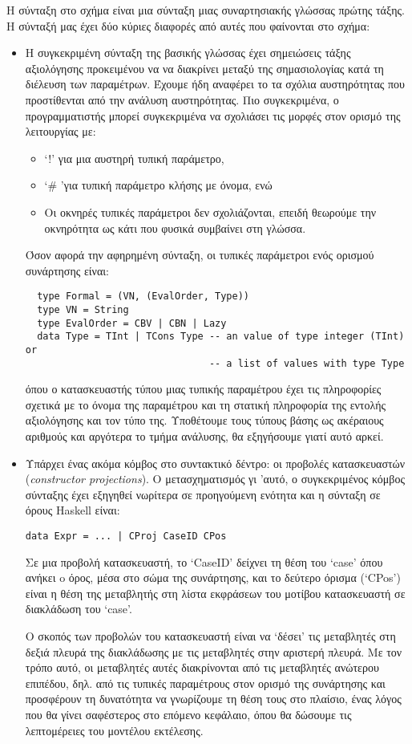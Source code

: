 \documentclass[diploma]{softlab-thesis}
\begin{document}
Η σύνταξη στο σχήμα είναι μια σύνταξη μιας συναρτησιακής γλώσσας πρώτης τάξης. Η σύνταξή μας έχει 
δύο κύριες διαφορές από αυτές που φαίνονται στο σχήμα:
\begin{itemize}
\item Η συγκεκριμένη σύνταξη της βασικής γλώσσας έχει σημειώσεις τάξης αξιολόγησης προκειμένου να
να διακρίνει μεταξύ της σημασιολογίας κατά τη διέλευση των παραμέτρων. Έχουμε ήδη αναφέρει το
τα σχόλια αυστηρότητας που προστίθενται από την ανάλυση αυστηρότητας.
Πιο συγκεκριμένα, ο προγραμματιστής μπορεί συγκεκριμένα να σχολιάσει τις μορφές στον ορισμό 
της λειτουργίας με:
\begin{itemize}
\item {`!' για μια αυστηρή τυπική παράμετρο,}
\item {`\# 'για τυπική παράμετρο κλήσης με όνομα, ενώ}
\item {Οι οκνηρές τυπικές παράμετροι δεν σχολιάζονται, επειδή θεωρούμε την 
οκνηρότητα ως κάτι που φυσικά συμβαίνει στη γλώσσα.}
\end{itemize}%

Όσον αφορά την αφηρημένη σύνταξη, οι τυπικές παράμετροι ενός ορισμού συνάρτησης είναι:
\begin{verbatim}
  type Formal = (VN, (EvalOrder, Type))
  type VN = String 
  type EvalOrder = CBV | CBN | Lazy 
  data Type = TInt | TCons Type -- an value of type integer (TInt) or 
                                -- a list of values with type Type
\end{verbatim}
όπου ο κατασκευαστής τύπου μιας τυπικής παραμέτρου έχει τις πληροφορίες σχετικά με το όνομα της παραμέτρου και
τη στατική πληροφορία της εντολής αξιολόγησης και τον τύπο της. Υποθέτουμε τους τύπους βάσης ως ακέραιους αριθμούς και αργότερα
το τμήμα ανάλυσης, θα εξηγήσουμε γιατί αυτό αρκεί.

\item Υπάρχει ένας ακόμα κόμβος στο συντακτικό δέντρο: οι προβολές κατασκευαστών (\textit{constructor projections}). 
Ο μετασχηματισμός γι 'αυτό, ο συγκεκριμένος κόμβος σύνταξης έχει εξηγηθεί νωρίτερα σε προηγούμενη ενότητα και η σύνταξη σε
όρους Haskell είναι:
\begin{verbatim}
data Expr = ... | CProj CaseID CPos
\end{verbatim}

Σε μια προβολή κατασκευαστή, το  `CaseID' δείχνει τη θέση του `case' όπου ανήκει o όρος, μέσα στο σώμα της συνάρτησης,
και το δεύτερο όρισμα (`CPos') είναι η θέση της μεταβλητής στη λίστα εκφράσεων του μοτίβου κατασκευαστή σε διακλάδωση του `case'.


Ο σκοπός των προβολών του κατασκευαστή είναι να `δέσει' τις μεταβλητές στη δεξιά πλευρά της διακλάδωσης με τις μεταβλητές
στην αριστερή πλευρά. Με τον τρόπο αυτό, οι μεταβλητές αυτές διακρίνονται από τις μεταβλητές ανώτερου επιπέδου, δηλ.
από τις τυπικές παραμέτρους στον ορισμό της συνάρτησης και προσφέρουν τη δυνατότητα να γνωρίζουμε τη θέση τους στο πλαίσιο,
ένας λόγος που θα γίνει σαφέστερος στο επόμενο κεφάλαιο, όπου θα δώσουμε τις λεπτομέρειες του μοντέλου εκτέλεσης.
\end{itemize}
\end{document}

